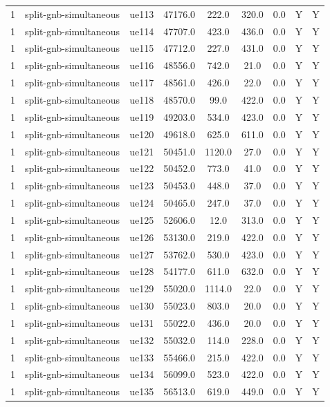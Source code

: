 \begin{table}[ht]
\begin{tabular}{|c|c|c|c|c|c|c|c|c|}
1 & split-gnb-simultaneous & ue113 & 47176.0 & 222.0 & 320.0 & 0.0 & Y & Y \\
1 & split-gnb-simultaneous & ue114 & 47707.0 & 423.0 & 436.0 & 0.0 & Y & Y \\
1 & split-gnb-simultaneous & ue115 & 47712.0 & 227.0 & 431.0 & 0.0 & Y & Y \\
1 & split-gnb-simultaneous & ue116 & 48556.0 & 742.0 & 21.0 & 0.0 & Y & Y \\
1 & split-gnb-simultaneous & ue117 & 48561.0 & 426.0 & 22.0 & 0.0 & Y & Y \\
1 & split-gnb-simultaneous & ue118 & 48570.0 & 99.0 & 422.0 & 0.0 & Y & Y \\
1 & split-gnb-simultaneous & ue119 & 49203.0 & 534.0 & 423.0 & 0.0 & Y & Y \\
1 & split-gnb-simultaneous & ue120 & 49618.0 & 625.0 & 611.0 & 0.0 & Y & Y \\
1 & split-gnb-simultaneous & ue121 & 50451.0 & 1120.0 & 27.0 & 0.0 & Y & Y \\
1 & split-gnb-simultaneous & ue122 & 50452.0 & 773.0 & 41.0 & 0.0 & Y & Y \\
1 & split-gnb-simultaneous & ue123 & 50453.0 & 448.0 & 37.0 & 0.0 & Y & Y \\
1 & split-gnb-simultaneous & ue124 & 50465.0 & 247.0 & 37.0 & 0.0 & Y & Y \\
1 & split-gnb-simultaneous & ue125 & 52606.0 & 12.0 & 313.0 & 0.0 & Y & Y \\
1 & split-gnb-simultaneous & ue126 & 53130.0 & 219.0 & 422.0 & 0.0 & Y & Y \\
1 & split-gnb-simultaneous & ue127 & 53762.0 & 530.0 & 423.0 & 0.0 & Y & Y \\
1 & split-gnb-simultaneous & ue128 & 54177.0 & 611.0 & 632.0 & 0.0 & Y & Y \\
1 & split-gnb-simultaneous & ue129 & 55020.0 & 1114.0 & 22.0 & 0.0 & Y & Y \\
1 & split-gnb-simultaneous & ue130 & 55023.0 & 803.0 & 20.0 & 0.0 & Y & Y \\
1 & split-gnb-simultaneous & ue131 & 55022.0 & 436.0 & 20.0 & 0.0 & Y & Y \\
1 & split-gnb-simultaneous & ue132 & 55032.0 & 114.0 & 228.0 & 0.0 & Y & Y \\
1 & split-gnb-simultaneous & ue133 & 55466.0 & 215.0 & 422.0 & 0.0 & Y & Y \\
1 & split-gnb-simultaneous & ue134 & 56099.0 & 523.0 & 422.0 & 0.0 & Y & Y \\
1 & split-gnb-simultaneous & ue135 & 56513.0 & 619.0 & 449.0 & 0.0 & Y & Y \\

\end{tabular}
\end{table}
